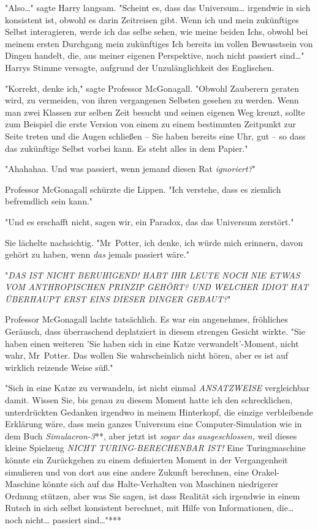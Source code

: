 {"Also…" sagte Harry langsam. "Scheint es, dass das Universum… irgendwie in sich konsistent ist, obwohl es darin Zeitreisen gibt. Wenn ich und mein zukünftiges Selbst interagieren, werde ich das selbe sehen, wie meine beiden Ichs, obwohl bei meinem ersten Durchgang mein zukünftiges Ich bereits im vollen Bewusstsein von Dingen handelt, die, aus meiner eigenen Perspektive, noch nicht passiert sind…" Harrys Stimme versagte, aufgrund der Unzulänglichkeit des Englischen.

"Korrekt, denke ich," sagte Professor McGonagall. "Obwohl Zauberern geraten wird, zu vermeiden, von ihren vergangenen Selbsten gesehen zu werden. Wenn man zwei Klassen zur selben Zeit besucht und seinen eigenen Weg kreuzt, sollte zum Beispiel die erste Version von einem zu einem bestimmten Zeitpunkt zur Seite treten und die Augen schließen -- Sie haben bereits eine Uhr, gut -- so dass das zukünftige Selbst vorbei kann. Es steht alles in dem Papier."

"Ahahahaa. Und was passiert, wenn jemand diesen Rat \emph{ignoriert?}"

Professor McGonagall schürzte die Lippen. "Ich verstehe, dass es ziemlich befremdlich sein kann."

"Und es erschafft nicht, sagen wir, ein Paradox, das das Universum zerstört."

Sie lächelte nachsichtig. "Mr~Potter, ich denke, ich würde mich erinnern, davon gehört zu haben, wenn \emph{das} jemals passiert wäre."

"\emph{DAS IST NICHT BERUHIGEND! HABT IHR LEUTE NOCH NIE ETWAS VOM ANTHROPISCHEN PRINZIP} \emph{GEHÖRT? UND WELCHER IDIOT HAT ÜBERHAUPT ERST EINS DIESER DINGER GEBAUT?}"

Professor McGonagall lachte tatsächlich. Es war ein angenehmes, fröhliches Geräusch, dass überraschend deplatziert in diesem strengen Gesicht wirkte. "Sie haben einen weiteren 'Sie haben sich in eine Katze verwandelt'-Moment, nicht wahr, Mr~Potter. Das wollen Sie wahrscheinlich nicht hören, aber es ist auf wirklich reizende Weise süß."

"Sich in eine Katze zu verwandeln, ist nicht einmal \emph{ANSATZWEISE} vergleichbar damit. Wissen Sie, bis genau zu diesem Moment hatte ich den schrecklichen, unterdrückten Gedanken irgendwo in meinem Hinterkopf, die einzige verbleibende Erklärung wäre, dass mein ganzes Universum eine Computer-Simulation wie in dem Buch \emph{Simulacron-3}**, aber jetzt ist \emph{sogar das ausgeschlossen,} weil dieses kleine Spielzeug \emph{NICHT TURING-BERECHENBAR IST!} Eine Turingmaschine könnte ein Zurückgehen zu einem definierten Moment in der Vergangenheit simulieren und von dort aus eine andere Zukunft berechnen, eine Orakel-Maschine könnte sich auf das Halte-Verhalten von Maschinen niedrigerer Ordnung stützen, aber was Sie sagen, ist dass Realität sich irgendwie in einem Rutsch in sich selbst konsistent berechnet, mit Hilfe von Informationen, die… noch nicht… passiert sind…"***

}
